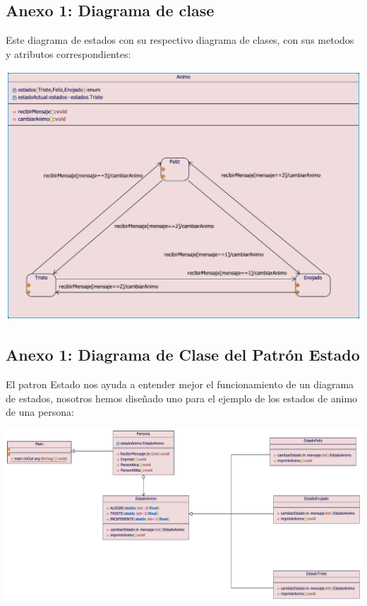 \newpage
\subsection{Anexo 1: Diagrama de clase}
Este diagrama de estados con su respectivo diagrama de clases, con sus metodos y atributos correspondientes:
\begin{center}
	{\includegraphics[width=1.18\linewidth]{imgs/Imagenes - Diagrama de estados/Anexo 1/animoclases}}\end{center}
\newpage
\subsection{Anexo 1: Diagrama de Clase del Patrón Estado}
\begin{flushleft}
	El patron Estado nos ayuda a entender mejor el funcionamiento de un diagrama de estados, nosotros hemos diseñado uno para el ejemplo de los estados de animo de una persona:
	\begin{center}
		{\includegraphics[width=1.18\linewidth]{imgs/Imagenes - Diagrama de estados/Anexo 1/diagramapatrones}}\end{center}
\end{flushleft}
\newpage
